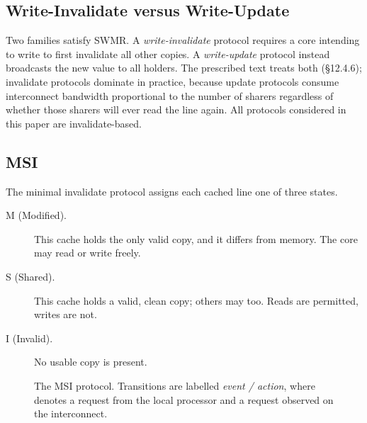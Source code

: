 \subsection{Write-Invalidate versus Write-Update}

Two families satisfy SWMR. A \emph{write-invalidate} protocol requires a core
intending to write to first invalidate all other copies.
A \emph{write-update}
protocol instead broadcasts the new value to all holders.
The prescribed text
treats both (\S12.4.6); invalidate protocols dominate in practice, because update
protocols consume interconnect bandwidth proportional to the number of sharers
regardless of whether those sharers will ever read the line again.
All protocols
considered in this paper are invalidate-based.

\subsection{MSI}

The minimal invalidate protocol assigns each cached line one of three states.

\begin{description}
\item[M (Modified).] This cache holds the only valid copy, and it differs from
  memory.
The core may read or write freely.
\item[S (Shared).] This cache holds a valid, clean copy; others may too. Reads
  are permitted, writes are not.
\item[I (Invalid).] No usable copy is present.
\end{description}

\begin{figure}[H]
\centering
{}
\caption{The MSI protocol. Transitions are labelled \emph{event / action}, where
 denotes a request from the local processor and  a request
observed on the interconnect.}
\label{fig:msi}
\end{figure}

